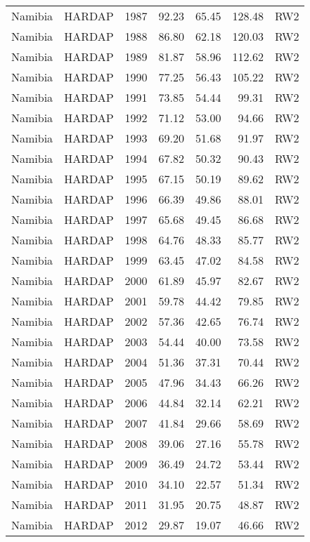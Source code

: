 \begin{longtable}{lllrrrl}
  Namibia & HARDAP & 1987 & 92.23 & 65.45 & 128.48 & RW2 \\ 
  Namibia & HARDAP & 1988 & 86.80 & 62.18 & 120.03 & RW2 \\ 
  Namibia & HARDAP & 1989 & 81.87 & 58.96 & 112.62 & RW2 \\ 
  Namibia & HARDAP & 1990 & 77.25 & 56.43 & 105.22 & RW2 \\ 
  Namibia & HARDAP & 1991 & 73.85 & 54.44 & 99.31 & RW2 \\ 
  Namibia & HARDAP & 1992 & 71.12 & 53.00 & 94.66 & RW2 \\ 
  Namibia & HARDAP & 1993 & 69.20 & 51.68 & 91.97 & RW2 \\ 
  Namibia & HARDAP & 1994 & 67.82 & 50.32 & 90.43 & RW2 \\ 
  Namibia & HARDAP & 1995 & 67.15 & 50.19 & 89.62 & RW2 \\ 
  Namibia & HARDAP & 1996 & 66.39 & 49.86 & 88.01 & RW2 \\ 
  Namibia & HARDAP & 1997 & 65.68 & 49.45 & 86.68 & RW2 \\ 
  Namibia & HARDAP & 1998 & 64.76 & 48.33 & 85.77 & RW2 \\ 
  Namibia & HARDAP & 1999 & 63.45 & 47.02 & 84.58 & RW2 \\ 
  Namibia & HARDAP & 2000 & 61.89 & 45.97 & 82.67 & RW2 \\ 
  Namibia & HARDAP & 2001 & 59.78 & 44.42 & 79.85 & RW2 \\ 
  Namibia & HARDAP & 2002 & 57.36 & 42.65 & 76.74 & RW2 \\ 
  Namibia & HARDAP & 2003 & 54.44 & 40.00 & 73.58 & RW2 \\ 
  Namibia & HARDAP & 2004 & 51.36 & 37.31 & 70.44 & RW2 \\ 
  Namibia & HARDAP & 2005 & 47.96 & 34.43 & 66.26 & RW2 \\ 
  Namibia & HARDAP & 2006 & 44.84 & 32.14 & 62.21 & RW2 \\ 
  Namibia & HARDAP & 2007 & 41.84 & 29.66 & 58.69 & RW2 \\ 
  Namibia & HARDAP & 2008 & 39.06 & 27.16 & 55.78 & RW2 \\ 
  Namibia & HARDAP & 2009 & 36.49 & 24.72 & 53.44 & RW2 \\ 
  Namibia & HARDAP & 2010 & 34.10 & 22.57 & 51.34 & RW2 \\ 
  Namibia & HARDAP & 2011 & 31.95 & 20.75 & 48.87 & RW2 \\ 
  Namibia & HARDAP & 2012 & 29.87 & 19.07 & 46.66 & RW2 \\ 

\end{longtable}
